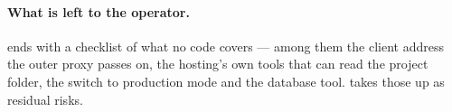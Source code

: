\paragraph{What is left to the operator.}  ends with a checklist of
what no code covers --- among them the client address the outer proxy passes on, the hosting's
own tools that can read the project folder, the switch to
production mode and the database tool.  takes those up as residual risks.

